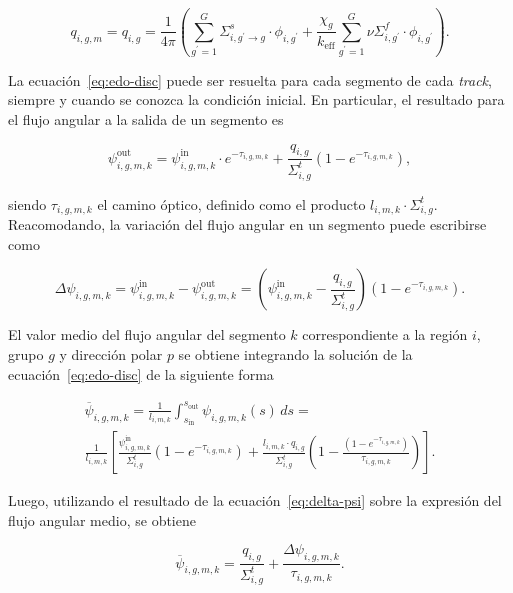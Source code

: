\documentclass[11pt]{article}
\numberwithin{equation}{section}
\begin{document}
\begin{equation} \label{eq:fuente-isotropica}
 q_{i,g,m} = q_{i,g} = 
 \frac{1}{4\pi} \left(
 \sum_{g^\prime=1}^G \Sigma^s_{i,g^\prime \rightarrow g} \cdot \phi_{i,g^\prime}
 + \frac{\chi_g}{k_{\text{eff}}} \sum_{g^\prime=1}^G \nu\Sigma^f_{i,g^\prime} \cdot \phi_{i,g^\prime}
 \right).
\end{equation}

La ecuación~\eqref{eq:edo-disc} puede ser resuelta para cada segmento de cada \emph{track}, siempre y cuando se conozca la condici\'on inicial. En particular, el resultado para el flujo angular a la salida de un segmento es

\begin{equation}
 \psi^{\text{out}}_{i,g,m,k} = \psi^{\text{in}}_{i,g,m,k} \cdot e^{-\tau_{i,g,m,k}}
 + \frac{q_{i,g}}{\Sigma^t_{i,g}} \left(1 - e^{-\tau_{i,g,m,k}} \right),
\end{equation}

\noindent
siendo $\tau_{i,g,m,k}$ el camino óptico, definido como el producto $l_{i,m,k} \cdot \Sigma^t_{i,g}$. Reacomodando, la variación del flujo angular en un segmento puede escribirse como

\begin{equation} \label{eq:delta-psi}
 \Delta \psi_{i,g,m,k} = 
 \psi^{\text{in}}_{i,g,m,k} - \psi^{\text{out}}_{i,g,m,k} = 
 \left( \psi^{\text{in}}_{i,g,m,k} - \frac{q_{i,g}}{\Sigma^t_{i,g}} \right) \left(1 - e^{-\tau_{i,g,m,k}} \right).
\end{equation}

El valor medio del flujo angular del segmento $k$ correspondiente a la región $i$, grupo $g$ y dirección polar $p$ se obtiene integrando la soluci\'on de la ecuación~\eqref{eq:edo-disc} de la siguiente forma

\begin{multline}
 \overline{\psi}_{i,g,m,k} =
 \frac{1}{l_{i,m,k}} \int_{s_{\text{in}}}^{s_{\text{out}}} \psi_{i,g,m,k} (s) \, ds = \\
 \frac{1}{l_{i,m,k}} \left[ \frac{\psi^{\text{in}}_{i,g,m,k}}{\Sigma^t_{i,g}} \left(1 - e^{-\tau_{i,g,m,k}} \right) + \frac{l_{i,m,k} \cdot q_{i,g}}{\Sigma^t_{i,g}} \left( 1 - \frac{\left(1 - e^{-\tau_{i,g,m,k}} \right)}{\tau_{i,g,m,k}} \right) \right].
\end{multline}

\noindent
Luego, utilizando el resultado de la ecuación~\eqref{eq:delta-psi} sobre la expresi\'on del flujo angular medio, se obtiene

\begin{equation} \label{eq:flujo-ang-medio-en-segmento}
 \overline{\psi}_{i,g,m,k} = \frac{q_{i,g}}{\Sigma^t_{i,g}} + \frac{\Delta \psi_{i,g,m,k}}{\tau_{i,g,m,k}}.
\end{equation}
\end{document}
